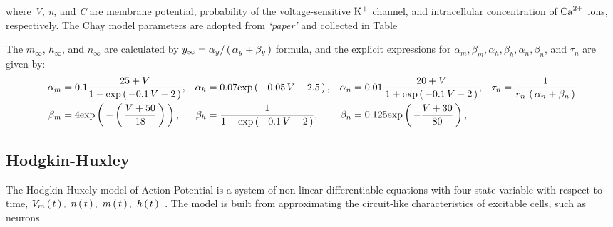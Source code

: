 \documentclass[../../Orator.tex]{subfiles}
\begin{document}
where \textit{V}, \textit{n}, and \textit{C} are membrane potential, probability of the voltage-sensitive \(\mathrm{K}^+\) channel, and intracellular concentration of \(\mathrm{Ca}^{2+}\) ions, respectively. The Chay model parameters are adopted from \textit{`paper'} and collected in Table

The \(m_\infty\), \(h_\infty\), and \(n_\infty\) are calculated by \(y_\infty = \alpha_y / \br{\alpha_y + \beta_y} \) formula, and the explicit expressions for 
\(\alpha_m, \beta_m, \alpha_h, \beta_h, \alpha_n, \beta_n\), and \(\tau_n\) are given by:
\begin{align*}
    \alpha_m &= 0.1 \frac{ 25 + V }{1 - \exp{-0.1 \, V - 2}}, &
    \alpha_h &=  0.07 \exp{-0.05\,V -2.5}, &
    \alpha_n &= 0.01 \, \frac{ 20 + V }{ 1 + \exp{-0.1 \, V - 2}}, &
    \tau_n &= \frac{1}{ r_n \, \br{\alpha_n + \beta_n} } \\
    \beta_m  &= 4 \exp{-\br{\frac{ V + 50 }{ 18 } } }, &
    \beta_h  &= \frac{ 1 }{ 1 + \exp{-0.1 \, V - 2}}, &
    \beta_n  &= 0.125 \exp{- \frac{V + 30}{80}}, &
\end{align*}




\subsection{Hodgkin-Huxley}

The Hodgkin-Huxely model of Action Potential is a system of non-linear differentiable equations with four state variable with respect to time, \(V_m\br{t}, \ n\br{t}, \ m\br{t}, \ h\br{t}\)~\cite{HodHux1952}. The model is built from approximating the circuit-like characteristics of excitable cells, such as neurons. 
\end{document}
